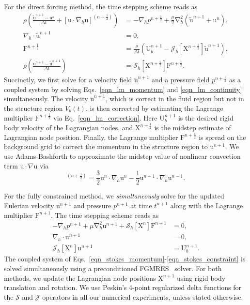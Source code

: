 \documentclass[review]{elsarticle}
\renewcommand{\vec}[1]{\bm{\mathrm{#1}}}
\newcommand{\V}[1]{\bm{\mathrm{#1}}}
\def \grad{\nabla}
\def \u{\vec{u}}
\def \F{\vec{F}}
\def \U{\vec{U}}
\def \Vbt{V_b(t)}
\def \F{\vec{F}}
\def \U{\vec{U}}
\def \X{\vec{X}}
\def \cS{\vec{\mathcal{S}}}
\def \cJ{\vec{\mathcal{J}}}
\def \half{\frac{1}{2}}
\def \u{\vec{u}}
\def \grad{\nabla}
\def \dt{\Delta t}
\def \dt{\Delta t}
\begin{document}
For the direct forcing method, the time stepping scheme reads as~\cite{Bhalla13}
\begin{align}
	\rho \left(\frac{\tilde{\u}^{n+ 1} - \u^n}{\dt} + [\u \cdot \grad_h \u]^{(n+\half)}\right) &= -\grad_h p^{n+\half} + \frac{\mu}{2} \V{\grad}^2_h\left( \tilde{\u}^{n+ 1} + \u^{n}\right), \label{eqn_lm_momentum} \\
	\grad_h \cdot \tilde{\u}^{n+1} &=  \V 0, \label{eqn_lm_continuity} \\
	\F^{n+\half} &= \frac{\rho}{\Delta t} \left(\U_b^{n+1} - \cJ_h[\X^{n+\half}] \tilde{\u}^{n+1} \right) \label{eqn_lm_correction}, \\
	 \rho \left(\frac{\u^{n+ 1} - \tilde{\u}^{n+1}}{\dt} \right) &= \cS_h[\X^{n+\half}] \F^{n+\half}.
\end{align}
Succinctly, we first solve for a velocity field $\tilde{\u}^{n+1}$ and a pressure field $p^{n+\half}$ as a coupled 
system by solving Eqs.~\eqref{eqn_lm_momentum} and  \eqref{eqn_lm_continuity} 
simultaneously. The velocity $\tilde{\u}^{n+1}$, which is correct in the fluid region but not 
in the structure region $\Vbt$, is then corrected by estimating the Lagrange multiplier 
$\F^{n+\half}$ via Eq.~\eqref{eqn_lm_correction}. Here $\U_b^{n+1}$ is the desired 
rigid body velocity of the Lagrangian nodes, and $\X^{n+\half}$ is the midstep 
estimate of Lagrangian node position. Finally, the Lagrange multiplier $\F^{n+\half}$ is 
spread on the background grid to correct the momentum in the structure region to 
$\u^{n+ 1}$. We use Adams-Bashforth to approximate the midstep value of  nonlinear 
convection term $\u \cdot \grad \u$ via
\begin{equation}
	[\u \cdot \grad_h \u]^{(n+\half)} = \frac{3}{2} \u^{n} \cdot \grad_h \u^{n} - \frac{1}{2} \u^{n-1} \cdot \grad_h \u^{n-1}.
\end{equation}

For the fully constrained method, we \emph{simultaneously} solve for the updated 
Eulerian velocity $\u^{n+1}$ and pressure $p^{n+1}$ at time $t^{n+1}$ along 
with the Lagrange multiplier $\F^{n+1}$. The time stepping scheme reads as~\cite{Kallemov16,Usabiaga17}
\begin{align}
	-\grad_h p^{n+1} + \mu \V{\grad}^2_h \u^{n+1} + \cS_h[\X^n]  \F^{n+1} & = \V 0, \label{eqn_stokes_momentum} \\
	\grad_h \cdot \u^{n+1} &=  \V 0, \label{eqn_stokes_continuity} \\
	\cJ_h[\X^n] \u^{n+1} &= \U_b^{n+1}. \label{eqn_stokes_constraint} 
\end{align}
The coupled system of Eqs.~\eqref{eqn_stokes_momentum}-\eqref{eqn_stokes_constraint} 
is solved simultaneously using a preconditioned FGMRES~\cite{Saad93} solver. For 
both methods, we update the Lagrangian node positions $\X^{n+1}$ using rigid body translation 
and rotation. We use Peskin's 4-point regularized delta functions for the $\cS$ and
$\cJ$ operators in all our numerical experiments, unless stated otherwise.  
\end{document}
